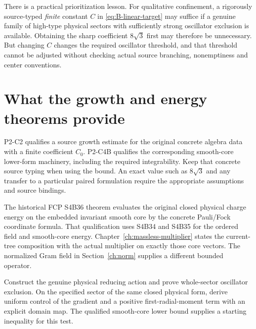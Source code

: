There is a practical prioritization lesson. For qualitative confinement,
a rigorously source-typed \emph{finite} constant \(C\) in
\eqref{eq:B-linear-target} may suffice if a genuine family of high-type
physical sectors with sufficiently strong oscillator exclusion is
available. Obtaining the sharp coefficient \(8\sqrt3\) first may
therefore be unnecessary. But changing \(C\) changes the required
oscillator threshold, and that threshold cannot be adjusted without
checking actual source branching, nonemptiness and center conventions.

\section{What the growth and energy theorems provide}
P2-C2 qualifies a source growth estimate for the original concrete
algebra data with a finite coefficient \(C_0\). P2-C4B qualifies
the corresponding smooth-core lower-form machinery, including the
required integrability. Keep that concrete source typing when using the
bound. An exact value such as \(8\sqrt3\) and any transfer to a
particular paired formulation require the appropriate assumptions
and source bindings.

The historical FCP S4B36 theorem evaluates the original closed
physical charge energy on the embedded invariant smooth core by
the concrete Pauli/Fock coordinate formula. That qualification
uses S4B34 and S4B35 for the ordered field and smooth-core energy.
Chapter~\ref{ch:massless-multiplier} states the current-tree
composition with the actual multiplier on exactly those core
vectors. The normalized Gram field in Section~\ref{ch:norm}
supplies a different bounded operator.

\begin{openproblem}\label{op:energy-to-moment}
Construct the genuine physical reducing action and prove whole-sector
oscillator exclusion. On the specified sector of the same closed
physical form, derive uniform control of the gradient and a positive
first-radial-moment term with an explicit domain map. The qualified
smooth-core lower bound supplies a starting inequality for this test.
\end{openproblem}

